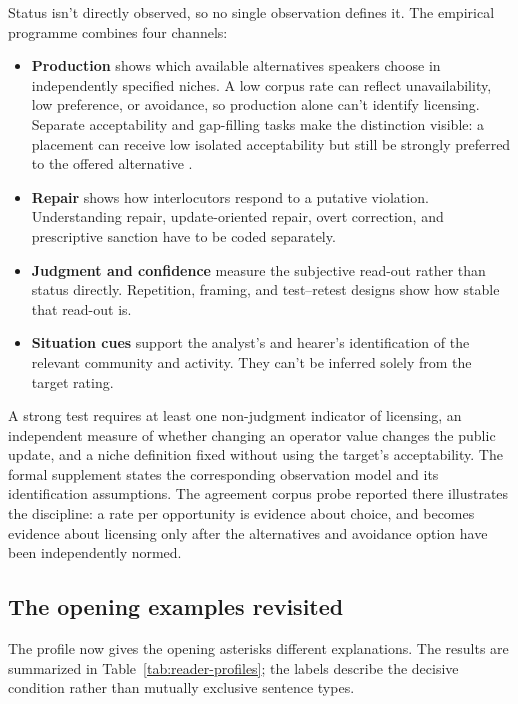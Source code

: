 Status isn't directly observed, so no single observation defines it. The
empirical programme combines four channels:

\begin{itemize}
\item \textbf{Production} shows which available alternatives speakers choose
  in independently specified niches. A low corpus rate can reflect
  unavailability, low preference, or avoidance, so production alone can't
  identify licensing. Separate acceptability and gap-filling tasks make the
  distinction visible: a placement can receive low isolated acceptability but
  still be strongly preferred to the offered alternative
  \autocite{nogueiraSanchez2025adverb}.
\item \textbf{Repair} shows how interlocutors respond to a putative violation.
  Understanding repair, update-oriented repair, overt correction, and
  prescriptive sanction have to be coded separately.
\item \textbf{Judgment and confidence} measure the subjective read-out rather
  than status directly. Repetition, framing, and test--retest designs show how
  stable that read-out is.
\item \textbf{Situation cues} support the analyst's and hearer's identification
  of the relevant community and activity. They can't be inferred solely from
  the target rating.
\end{itemize}

A strong test requires at least one non-judgment indicator of licensing, an
independent measure of whether changing an operator value changes the public
update, and a niche definition fixed without using the target's acceptability.
The formal supplement states the corresponding observation model and its
identification assumptions. The agreement corpus probe reported there
illustrates the discipline: a rate per opportunity is evidence about choice,
and becomes evidence about licensing only after the alternatives and avoidance
option have been independently normed.

\subsection{The opening examples revisited}
\label{sec:worked-examples}
\label{sec:diag-tree}

The profile now gives the opening asterisks different explanations. The results
are summarized in Table~\ref{tab:reader-profiles}; the labels describe the
decisive condition rather than mutually exclusive sentence types.

